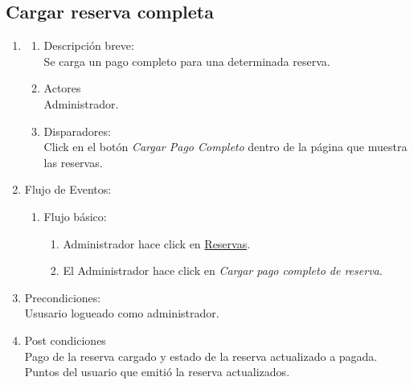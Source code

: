 \documentclass[a4paper,11pt]{article}
\begin{document}
\subsection{Cargar reserva completa}
\begin{enumerate}

    \item
    \begin{enumerate}
    \item Descripción breve: \\
        Se carga un pago completo para una determinada reserva.
    \item Actores \\
        Administrador.
    \item Disparadores: \\
        Click en el botón \emph{Cargar Pago Completo} dentro de la página que muestra las reservas.
    \end{enumerate}

    \item Flujo de Eventos:

    \begin{enumerate}

        \item Flujo básico:
	\begin{enumerate}
            \item Administrador hace click en \underline{Reservas}. 
	    \item El Administrador hace click en \emph{Cargar pago completo de reserva}.
	\end{enumerate}
    \end{enumerate}

    \item Precondiciones: \\
        Ususario logueado como administrador.

    \item Post condiciones \\
        Pago de la reserva cargado y estado de la reserva actualizado a pagada.
        Puntos del usuario que emitió la reserva actualizados.

\end{enumerate}


\end{document}
